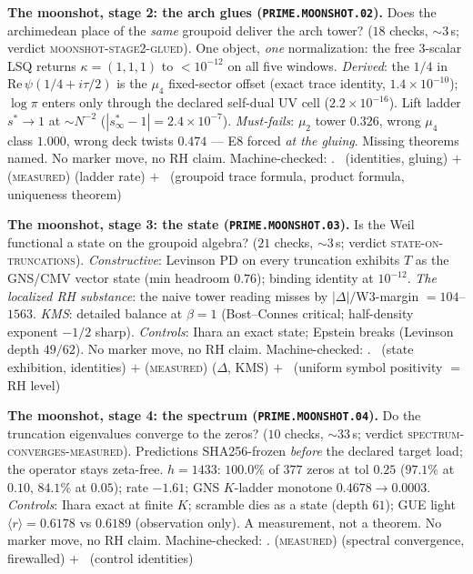 \documentclass[11pt,a4paper]{article}
\theoremstyle{definition}
\begin{document}
\par\smallskip\noindent\textbf{The moonshot, stage 2: the arch glues
(\texttt{PRIME.MOONSHOT.02}).}
Does the archimedean place of the \emph{same} groupoid deliver the
arch tower? ($18$ checks, ${\sim}3$\,s; verdict
\textsc{moonshot-stage2-glued}).  One object, \emph{one}
normalization: the free 3-scalar LSQ returns $\kappa=(1,1,1)$ to
$<10^{-12}$ on all five windows.  \emph{Derived}: the $1/4$ in
$\mathrm{Re}\,\psi(1/4+i\tau/2)$ is the $\mu_4$ fixed-sector offset
(exact trace identity, $1.4\times10^{-10}$); $\log\pi$ enters only
through the declared self-dual UV cell ($2.2\times10^{-16}$).  Lift
ladder $s^*\to1$ at ${\sim}N^{-2}$ ($|s^*_\infty-1|=2.4\times
10^{-7}$).  \emph{Must-fails}: $\mu_2$ tower $0.326$, wrong $\mu_4$
class $1.000$, wrong deck twists $0.474$ --- E8 forced \emph{at the
gluing}.  Missing theorems named.  No marker move, no RH claim.
Machine-checked: .
\mE\ (identities, gluing) $+$ (\textsc{measured}) (ladder rate) $+$
\mO\ (groupoid trace formula, product formula, uniqueness theorem)
\par\smallskip

\par\smallskip\noindent\textbf{The moonshot, stage 3: the state
(\texttt{PRIME.MOONSHOT.03}).}
Is the Weil functional a state on the groupoid algebra? ($21$
checks, ${\sim}3$\,s; verdict \textsc{state-on-truncations}).
\emph{Constructive}: Levinson PD on every truncation exhibits $T$ as
the GNS/CMV vector state (min headroom $0.76$); binding identity at
$10^{-12}$.  \emph{The localized RH substance}: the naive tower
reading misses by $|\Delta|/\mathrm{W3}$-margin $=104$--$1563$.
\emph{KMS}: detailed balance at $\beta=1$ (Bost--Connes critical;
half-density exponent $-1/2$ sharp).  \emph{Controls}: Ihara an
exact state; Epstein breaks (Levinson depth $49/62$).  No marker
move, no RH claim.
Machine-checked: .
\mE\ (state exhibition, identities) $+$ (\textsc{measured})
($\Delta$, KMS) $+$ \mO\ (uniform symbol positivity $=$ RH level)
\par\smallskip

\par\smallskip\noindent\textbf{The moonshot, stage 4: the spectrum
(\texttt{PRIME.MOONSHOT.04}).}
Do the truncation eigenvalues converge to the zeros? ($10$ checks,
${\sim}33$\,s; verdict \textsc{spectrum-converges-measured}).
Predictions SHA256-frozen \emph{before} the declared target load;
the operator stays zeta-free.  $h=1433$: $100.0\%$ of $377$ zeros at
tol $0.25$ ($97.1\%$ at $0.10$, $84.1\%$ at $0.05$); rate $-1.61$;
GNS $K$-ladder monotone $0.4678\to0.0003$.  \emph{Controls}: Ihara
exact at finite $K$; scramble dies as a state (depth $61$); GUE
light $\langle r\rangle=0.6178$ vs $0.6189$ (observation only).  A
measurement, not a theorem.  No marker move, no RH claim.
Machine-checked: .
(\textsc{measured}) (spectral convergence, firewalled) $+$ \mE\
(control identities)
\par\smallskip
\end{document}
